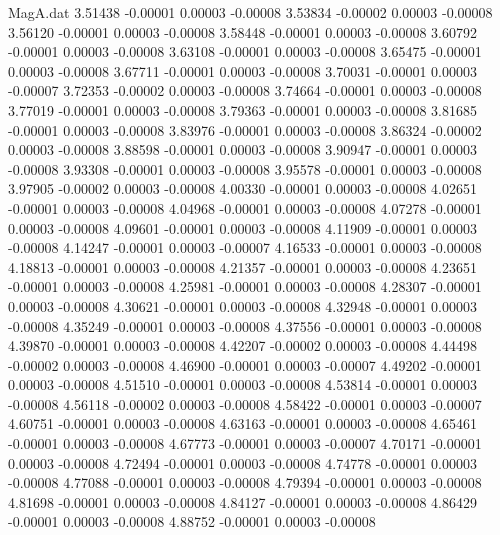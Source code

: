\begin{filecontents}{MagA.dat}
   3.51438   -0.00001    0.00003   -0.00008
   3.53834   -0.00002    0.00003   -0.00008
   3.56120   -0.00001    0.00003   -0.00008
   3.58448   -0.00001    0.00003   -0.00008
   3.60792   -0.00001    0.00003   -0.00008
   3.63108   -0.00001    0.00003   -0.00008
   3.65475   -0.00001    0.00003   -0.00008
   3.67711   -0.00001    0.00003   -0.00008
   3.70031   -0.00001    0.00003   -0.00007
   3.72353   -0.00002    0.00003   -0.00008
   3.74664   -0.00001    0.00003   -0.00008
   3.77019   -0.00001    0.00003   -0.00008
   3.79363   -0.00001    0.00003   -0.00008
   3.81685   -0.00001    0.00003   -0.00008
   3.83976   -0.00001    0.00003   -0.00008
   3.86324   -0.00002    0.00003   -0.00008
   3.88598   -0.00001    0.00003   -0.00008
   3.90947   -0.00001    0.00003   -0.00008
   3.93308   -0.00001    0.00003   -0.00008
   3.95578   -0.00001    0.00003   -0.00008
   3.97905   -0.00002    0.00003   -0.00008
   4.00330   -0.00001    0.00003   -0.00008
   4.02651   -0.00001    0.00003   -0.00008
   4.04968   -0.00001    0.00003   -0.00008
   4.07278   -0.00001    0.00003   -0.00008
   4.09601   -0.00001    0.00003   -0.00008
   4.11909   -0.00001    0.00003   -0.00008
   4.14247   -0.00001    0.00003   -0.00007
   4.16533   -0.00001    0.00003   -0.00008
   4.18813   -0.00001    0.00003   -0.00008
   4.21357   -0.00001    0.00003   -0.00008
   4.23651   -0.00001    0.00003   -0.00008
   4.25981   -0.00001    0.00003   -0.00008
   4.28307   -0.00001    0.00003   -0.00008
   4.30621   -0.00001    0.00003   -0.00008
   4.32948   -0.00001    0.00003   -0.00008
   4.35249   -0.00001    0.00003   -0.00008
   4.37556   -0.00001    0.00003   -0.00008
   4.39870   -0.00001    0.00003   -0.00008
   4.42207   -0.00002    0.00003   -0.00008
   4.44498   -0.00002    0.00003   -0.00008
   4.46900   -0.00001    0.00003   -0.00007
   4.49202   -0.00001    0.00003   -0.00008
   4.51510   -0.00001    0.00003   -0.00008
   4.53814   -0.00001    0.00003   -0.00008
   4.56118   -0.00002    0.00003   -0.00008
   4.58422   -0.00001    0.00003   -0.00007
   4.60751   -0.00001    0.00003   -0.00008
   4.63163   -0.00001    0.00003   -0.00008
   4.65461   -0.00001    0.00003   -0.00008
   4.67773   -0.00001    0.00003   -0.00007
   4.70171   -0.00001    0.00003   -0.00008
   4.72494   -0.00001    0.00003   -0.00008
   4.74778   -0.00001    0.00003   -0.00008
   4.77088   -0.00001    0.00003   -0.00008
   4.79394   -0.00001    0.00003   -0.00008
   4.81698   -0.00001    0.00003   -0.00008
   4.84127   -0.00001    0.00003   -0.00008
   4.86429   -0.00001    0.00003   -0.00008
   4.88752   -0.00001    0.00003   -0.00008

\end{filecontents}
